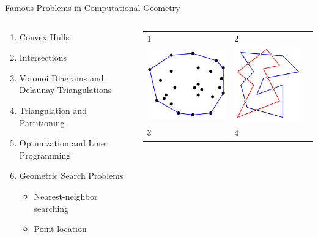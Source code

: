 \documentclass{beamer}
\begin{document}
\begin{frame}{Famous Problems in Computational Geometry}
\begin{columns}[T]
\begin{column}{.55\textwidth}
    \begin{enumerate}
        \item {Convex Hulls} 
        \item {Intersections} 
        \item {Voronoi Diagrams and Delaunay Triangulations}
        \item {Triangulation and Partitioning}
        \item {Optimization and Liner Programming} 
        \item {Geometric Search Problems}
        \begin{itemize}
            \item Nearest-neighbor searching 
            \item Point location 
        \end{itemize}
    \end{enumerate}
\end{column}
\hfill
\begin{column}{.4\textwidth}
\begin{tabular}{lll}
\centering
    {\scriptsize 1} & {\scriptsize 2} \\
\includegraphics[width=.35\linewidth,valign=m]{cnvxhull.png} &
    \includegraphics[width=.3\linewidth,valign=m]{intersect.png} \\
    {\scriptsize 3}  & {\scriptsize 4}  \\

\end{tabular}
\end{column}
\end{columns}
\end{frame}
\end{document}
